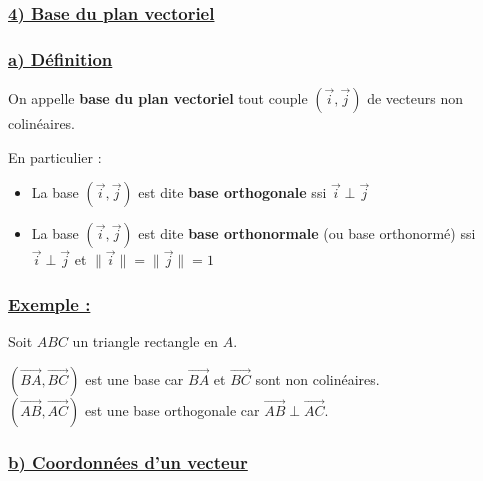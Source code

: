 \documentclass[12pt,a4paper]{article}
\begin{document}
\subsubsection*{\centering \underline{\color{red} 4) Base du plan vectoriel}}
\subsubsection*{\centering \underline{\color{red} a) Définition}}

\vspace{0.3cm}

On appelle \textbf{base du plan vectoriel} tout couple {\color{red} $(\vec{i}, \vec{j})$} de vecteurs non colinéaires.

\vspace{0.2cm}

{\color{red} En particulier :}
\begin{itemize}
    \item[\color{red} i)] La base {\color{red} $(\vec{i}, \vec{j})$} est dite \textbf{base orthogonale} ssi {\color{red} $\vec{i} \perp \vec{j}$}
    \item[\color{red} ii)] La base {\color{red} $(\vec{i}, \vec{j})$} est dite \textbf{base orthonormale} (ou base orthonormé) ssi {\color{red} $\vec{i} \perp \vec{j}$} et {\color{red} $\|\vec{i}\| = \|\vec{j}\| = 1$}
\end{itemize}

\subsubsection*{\centering \underline{\color{red} Exemple :}}

Soit $ABC$ un triangle rectangle en $A$.

\begin{center}
\end{center}

{\color{red}$(\vec{BA}, \vec{BC})$} est une base car $\vec{BA}$ et $\vec{BC}$ sont non colinéaires. \\
{\color{red}$(\vec{AB}, \vec{AC})$} est une base orthogonale car {\color{red}$\vec{AB} \perp \vec{AC}$}.

\vspace{0.5cm}

\subsubsection*{\centering \underline{\color{red} b) Coordonnées d'un vecteur}}
\end{document}
